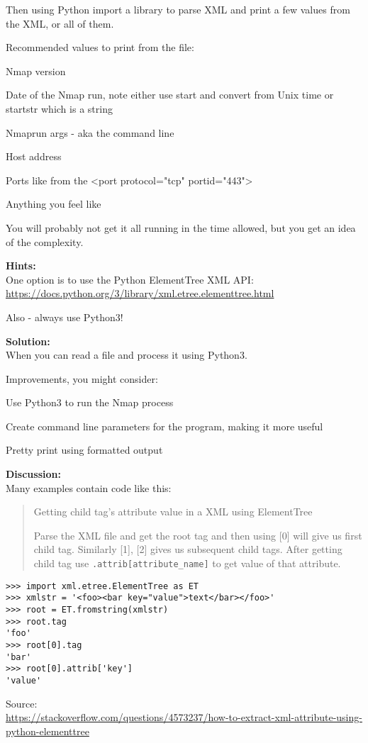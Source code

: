\documentclass[a4paper,11pt,notitlepage]{report}
\begin{document}
Then using Python import a library to parse XML and print a few values from the XML, or all of them.

Recommended values to print from the file:
\begin{list2}
\item Nmap version
\item Date of the Nmap run, note either use start and convert from Unix time or startstr which is a string
\item Nmaprun args - aka the command line
\item Host address
\item Ports like from the <port protocol="tcp" portid="443">
\item Anything you feel like
\end{list2}

You will probably not get it all running in the time allowed, but you get an idea of the complexity.

{\bf Hints:}\\
One option is to use the Python ElementTree XML API:\\
\url{https://docs.python.org/3/library/xml.etree.elementtree.html}

Also - always use Python3!

{\bf Solution:}\\
When you can read a file and process it using Python3.

Improvements, you might consider:
\begin{list2}
\item Use Python3 to run the Nmap process
\item Create command line parameters for the program, making it more useful
\item Pretty print using formatted output
\end{list2}
{\bf Discussion:}\\
Many examples contain code like this:

\begin{quote}
Getting child tag's attribute value in a XML using ElementTree

Parse the XML file and get the root tag and then using [0] will give us first child tag. Similarly [1], [2] gives us subsequent child tags. After getting child tag use \verb+.attrib[attribute_name]+ to get value of that attribute.
\end{quote}
\begin{verbatim}
>>> import xml.etree.ElementTree as ET
>>> xmlstr = '<foo><bar key="value">text</bar></foo>'
>>> root = ET.fromstring(xmlstr)
>>> root.tag
'foo'
>>> root[0].tag
'bar'
>>> root[0].attrib['key']
'value'
\end{verbatim}
Source:\\{\footnotesize \url{https://stackoverflow.com/questions/4573237/how-to-extract-xml-attribute-using-python-elementtree}}
\end{document}
